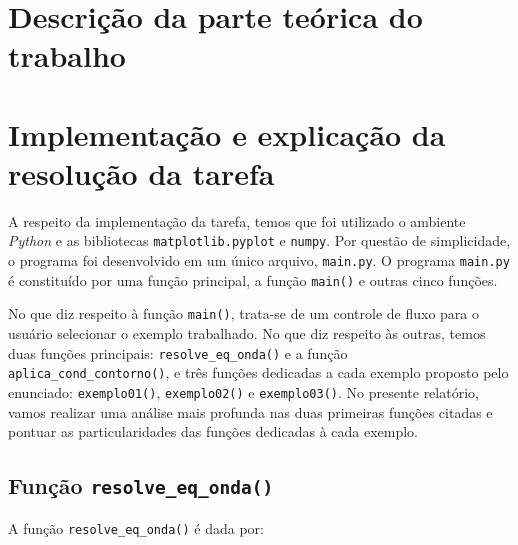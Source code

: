 \documentclass[column,amsmath,amssymb,floatfix]{revtex4}
\begin{document}
\section{Descrição da parte teórica do trabalho}

\section{Implementação e explicação da resolução da tarefa}

A respeito da implementação da tarefa, temos que foi utilizado o ambiente \textit{Python} e as bibliotecas \texttt{matplotlib.pyplot} e \texttt{numpy}. Por questão de simplicidade, o programa foi desenvolvido em um único arquivo, \texttt{main.py}. O programa \texttt{main.py} é constituído por uma função principal, a função \texttt{main()} e outras cinco funções.

No que diz respeito à função \texttt{main()}, trata-se de um controle de fluxo para o usuário selecionar o exemplo trabalhado. No que diz respeito às outras, temos duas funções principais: \texttt{resolve\_eq\_onda()} e a função \texttt{aplica\_cond\_contorno()}, e três funções dedicadas a cada exemplo proposto pelo enunciado: \texttt{exemplo01()}, \texttt{exemplo02()} e \texttt{exemplo03()}. No presente relatório, vamos realizar uma análise mais profunda nas duas primeiras funções citadas e pontuar as particularidades das funções dedicadas à cada exemplo.



\subsection{Função \texttt{resolve\_eq\_onda()}}

A função \texttt{resolve\_eq\_onda()} é dada por:
\end{document}
